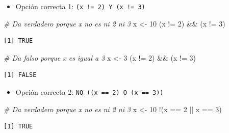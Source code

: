 \documentclass[
]{book}
\newenvironment{Shaded}{\begin{snugshade}}{\end{snugshade}}
\newcommand{\CommentTok}[1]{\textcolor[rgb]{0.56,0.35,0.01}{\textit{#1}}}
\newcommand{\DecValTok}[1]{\textcolor[rgb]{0.00,0.00,0.81}{#1}}
\newcommand{\NormalTok}[1]{#1}
\newcommand{\OtherTok}[1]{\textcolor[rgb]{0.56,0.35,0.01}{#1}}
\newcommand{\SpecialCharTok}[1]{\textcolor[rgb]{0.00,0.00,0.00}{#1}}
\providecommand{\tightlist}{%
  \setlength{\itemsep}{0pt}\setlength{\parskip}{0pt}}
\begin{document}
\begin{enumerate}
  \begin{itemize}
  \tightlist
  \item
    Opción correcta 1: \texttt{(x\ !=\ 2)\ Y\ (x\ !=\ 3)}
  \end{itemize}

\begin{Shaded}
\begin{Highlighting}[]
\CommentTok{\# Da verdadero porque x no es ni 2 ni 3}
\NormalTok{x }\OtherTok{\textless{}{-}} \DecValTok{10}
\NormalTok{(x }\SpecialCharTok{!=} \DecValTok{2}\NormalTok{) }\SpecialCharTok{\&\&}\NormalTok{ (x }\SpecialCharTok{!=} \DecValTok{3}\NormalTok{)}
\end{Highlighting}
\end{Shaded}

\begin{verbatim}
[1] TRUE
\end{verbatim}

\begin{Shaded}
\begin{Highlighting}[]
\CommentTok{\# Da falso porque x es igual a 3}
\NormalTok{x }\OtherTok{\textless{}{-}} \DecValTok{3}
\NormalTok{(x }\SpecialCharTok{!=} \DecValTok{2}\NormalTok{) }\SpecialCharTok{\&\&}\NormalTok{ (x }\SpecialCharTok{!=} \DecValTok{3}\NormalTok{)}
\end{Highlighting}
\end{Shaded}

\begin{verbatim}
[1] FALSE
\end{verbatim}

  \begin{itemize}
  \tightlist
  \item
    Opción correcta 2: \texttt{NO\ ((x\ ==\ 2)\ O\ (x\ ==\ 3))}
  \end{itemize}

\begin{Shaded}
\begin{Highlighting}[]
\CommentTok{\# Da verdadero porque x no es ni 2 ni 3}
\NormalTok{x }\OtherTok{\textless{}{-}} \DecValTok{10}
\SpecialCharTok{!}\NormalTok{(x }\SpecialCharTok{==} \DecValTok{2} \SpecialCharTok{||}\NormalTok{ x }\SpecialCharTok{==} \DecValTok{3}\NormalTok{)}
\end{Highlighting}
\end{Shaded}

\begin{verbatim}
[1] TRUE
\end{verbatim}


\end{enumerate}
\end{document}
